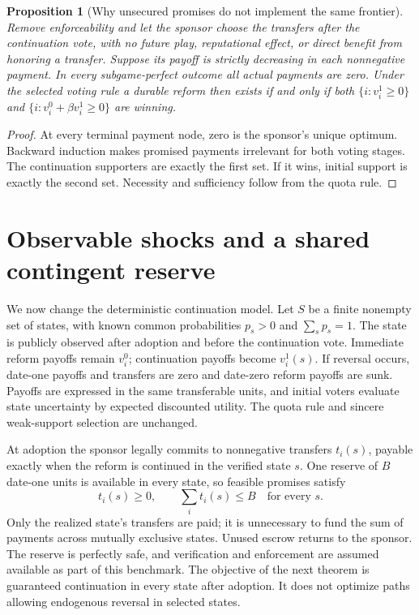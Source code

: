 \documentclass[11pt]{article}
\newtheorem{proposition}{Proposition}
\theoremstyle{definition}
\begin{document}
\begin{proposition}[Why unsecured promises do not implement the same frontier]
Remove enforceability and let the sponsor choose the transfers after the continuation vote, with no future play, reputational effect, or direct benefit from honoring a transfer. Suppose its payoff is strictly decreasing in each nonnegative payment. In every subgame-perfect outcome all actual payments are zero. Under the selected voting rule a durable reform then exists if and only if both $\{i:v_i^1\geq0\}$ and $\{i:v_i^0+\beta v_i^1\geq0\}$ are winning.
\end{proposition}
\begin{proof}
At every terminal payment node, zero is the sponsor's unique optimum. Backward induction makes promised payments irrelevant for both voting stages. The continuation supporters are exactly the first set. If it wins, initial support is exactly the second set. Necessity and sufficiency follow from the quota rule.
\end{proof}


\section*{Observable shocks and a shared contingent reserve}
We now change the deterministic continuation model. Let $S$ be a finite
nonempty set of states, with known common probabilities $p_s>0$ and
$\sum_s p_s=1$. The state is publicly observed after adoption and before
the continuation vote. Immediate reform payoffs remain $v_i^0$;
continuation payoffs become $v_i^1(s)$. If reversal occurs, date-one
payoffs and transfers are zero and date-zero reform payoffs are sunk.
Payoffs are expressed in the same transferable units, and initial
voters evaluate state uncertainty by expected discounted utility.
The quota rule and sincere weak-support selection are unchanged.

At adoption the sponsor legally commits to nonnegative transfers
$t_i(s)$, payable exactly when the reform is continued in the verified
state $s$. One reserve of $B$ date-one units is available in every
state, so feasible promises satisfy
\[
 t_i(s)\geq0,\qquad \sum_i t_i(s)\leq B\quad\text{for every }s.
\]
Only the realized state's transfers are paid; it is unnecessary to
fund the sum of payments across mutually exclusive states. Unused
escrow returns to the sponsor. The reserve is perfectly safe, and
verification and enforcement are assumed available as part of this
benchmark. The objective of the next theorem is guaranteed continuation
in every state after adoption. It does not optimize paths allowing
endogenous reversal in selected states.
\end{document}
